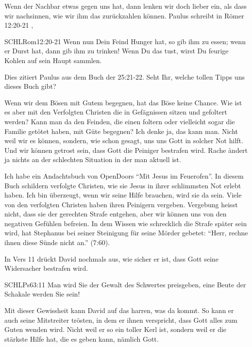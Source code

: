 \documentclass[14pt]{../../inc/mybib}
\begin{document}
    \begin{block}
    Wenn der Nachbar etwas gegen uns hat, dann lenken wir doch lieber ein, als dass wir nachsinnen, wie wir ihm das zurückzahlen können. Paulus schreibt in Römer 12:20-21 , 
    \begin{bibelbox}{SCHL}{Rom}{12:20-21}
        Wenn nun Dein Feind Hunger hat, so gib ihm zu essen; wenn er Durst hat, dann gib ihm zu trinken! Wenn Du das tust, wirst Du feurige Kohlen auf sein Haupt sammlen.
    \end{bibelbox}
    Dies zitiert Paulus aus dem Buch der  {25:21-22}. Seht Ihr, welche tollen Tipps uns dieses Buch gibt? 

    Wenn wir dem Bösen mit Gutem begegnen, hat das Böse keine Chance. Wie ist es aber mit den Verfolgten Christen die in Gefägnissen sitzen und gefoltert werden? Kann man da den Feinden, die einen foltern oder vielleicht sogar die Familie getötet haben, mit Güte begegnen? Ich denke ja, das kann man. Nicht weil wir es können, sondern, wie schon gesagt, uns uns Gott in solcher Not hilft. Und wir können getrost sein, dass Gott die Peiniger bestrafen wird. Rache ändert ja nichts an der schlechten Situation in der man aktuell ist. 
    
    Ich habe ein Andachtsbuch von OpenDoors \enquote{Mit Jesus im Feuerofen}. In diesem Buch schildern verfolgte Christen, wie sie Jesus in ihrer schlimmsten Not erlebt haben. Ich bin überzeugt, wenn wir seine Hilfe brauchen, wird sie da sein. Viele von den verfolgten Christen haben ihren Peinigern vergeben. Vergebung heisst nicht, dass sie der gerechten Strafe entgehen, aber wir können uns von den negativen Gefühlen befreien. In dem Wissen wie schrecklich die Strafe später sein wird, hat Stephanus bei seiner Steinigung für seine Mörder gebetet: \enquote{Herr, rechne ihnen diese Sünde nicht an.} (7:60).
\end{block}
\begin{block}
    In Vers 11 drückt David nochmals aus, wie sicher er ist, dass Gott seine Widersacher bestrafen wird.
    \begin{bibelbox}{SCHL}{Ps}{63:11}
        Man wird Sie der Gewalt des Schwertes preisgeben, eine Beute der Schakale werden Sie sein!
    \end{bibelbox}
    Mit dieser Gewissheit kann David auf das harren, was da kommt. So kann er auch seine Mitstreiter trösten, in dem er ihnen verspricht, dass Gott alles zum Guten wenden wird. 
    Nicht weil er so ein toller Kerl ist, sondern weil er die stärkste Hilfe hat, die es geben kann, nämlich Gott. 
\end{block}
\end{document}
